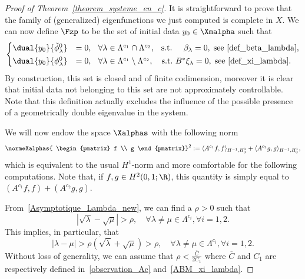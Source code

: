 \begin{proof}[Proof of Theorem~\ref{theorem_systeme_en_c}]
It is straightforward to prove that the family of (generalized) eigenfunctions we just computed is complete in $X$. We can now define $\Fzp$ to be the set of initial data $y_0\in \Xmalpha$ such that
\begin{equation}\label{conditions_Y0}
\begin{cases}
\dual{y_0}{\tilde{\phi}^0_\lambda} & = 0, \mkern13mu \forall \lambda\in \Lambda^{c_1}\cap \Lambda^{c_2}, \mkern14mu\text{s.t.} \mkern25mu \beta_\lambda=0, \; \text{see~\eqref{def_beta_lambda}},\\[0.15em] 
\dual{y_0}{\phi_\lambda^0} & = 0, \ \mkern7mu \forall \lambda\in \Lambda^{c_1}\setminus \Lambda^{c_2}, \quad\text{s.t.} \ B^* \xi_\lambda=0, \; \text{see~\eqref{def_xi_lambda}}.
\end{cases}
\end{equation}
By construction, this set is closed and of finite codimension, moreover it is clear that initial data not belonging to this set are not approximately controllable. Note that this definition actually excludes the influence of the possible presence of a geometrically double eigenvalue in the system.



We will now endow the space $\Xalphas$ with the following norm
\[
\normeXalphas{
\begin{pmatrix} f \\ g
\end{pmatrix}}^2 := \langle A^{c_1} f,f\rangle_{H^{-1},H^1_0} + \langle A^{c_2} g,g\rangle_{H^{-1},H^1_0},
\]
which is equivalent to the usual $H^1$-norm and more comfortable for the following computations. Note that, if $f,g\in H^2(0,1 ; \R)$, this quantity is simply equal to $(A^{c_1} f,f) + (A^{c_2}g,g)$.


From~\eqref{Asymptotique_Lambda_new}, we can find a $\rho>0$ such that
\[
\left|\sqrt{\lambda}-\sqrt{\mu}\right| > \rho, \quad\forall \lambda\neq \mu \in \Lambda^{c_i}, \forall i=1,2.
\]
This implies, in particular, that
\begin{equation}\label{gap_potentiel}
|\lambda-\mu| > \rho \left(\sqrt{\lambda}+\sqrt{\mu}\right) > \rho, \quad \forall \lambda\neq \mu \in \Lambda^{c_i}, \forall i=1,2.
\end{equation}
Without loss of generality, we can assume that $\rho < \frac{\overline{C}}{2 C_1}$ where $\overline{C}$ and $C_1$ are respectively defined in~\eqref{observation_Ac} and~\eqref{ABM_xi_lambda}.


\end{proof}
